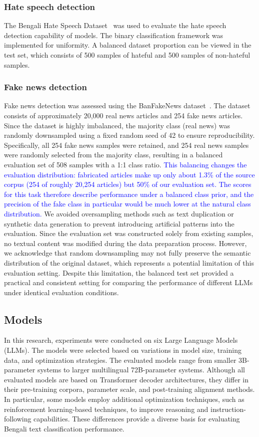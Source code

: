 \documentclass[10pt,letterpaper]{article}
\newcommand{\rev}[1]{\textcolor{blue}{#1}}
\begin{document}
\subsubsection*{Hate speech detection}
The Bengali Hate Speech Dataset~\cite{b33} was used to evaluate the hate speech detection capability of models. The binary classification framework was implemented for uniformity. A balanced dataset proportion can be viewed in the test set, which consists of 500 samples of hateful and 500 samples of non-hateful samples.

\subsubsection*{Fake news detection}
Fake news detection was assessed using the BanFakeNews dataset~\cite{b34}. The dataset consists of approximately 20,000 real news articles and 254 fake news articles. Since the dataset is highly imbalanced, the majority class (real news) was randomly downsampled using a fixed random seed of 42 to ensure reproducibility. Specifically, all 254 fake news samples were retained, and 254 real news samples were randomly selected from the majority class, resulting in a balanced evaluation set of 508 samples with a 1:1 class ratio. \rev{This balancing changes the evaluation distribution: fabricated articles make up only about 1.3\% of the source corpus (254 of roughly 20,254 articles) but 50\% of our evaluation set. The scores for this task therefore describe performance under a balanced class prior, and the precision of the fake class in particular would be much lower at the natural class distribution.} We avoided oversampling methods such as text duplication or synthetic data generation to prevent introducing artificial patterns into the evaluation. Since the evaluation set was constructed solely from existing samples, no textual content was modified during the data preparation process. However, we acknowledge that random downsampling may not fully preserve the semantic distribution of the original dataset, which represents a potential limitation of this evaluation setting. Despite this limitation, the balanced test set provided a practical and consistent setting for comparing the performance of different LLMs under identical evaluation conditions.



\subsection*{Models}
In this research, experiments were conducted on six Large Language Models (LLMs). 
The models were selected based on variations in model size, training data, and 
optimization strategies. The evaluated models range from smaller 3B-parameter 
systems to larger multilingual 72B-parameter systems. Although all evaluated 
models are based on Transformer decoder architectures, they differ in their 
pre-training corpora, parameter scale, and post-training alignment methods. 
In particular, some models employ additional optimization techniques, such as 
reinforcement learning-based techniques, to improve reasoning and 
instruction-following capabilities. These differences provide a diverse basis 
for evaluating Bengali text classification performance.
\end{document}
